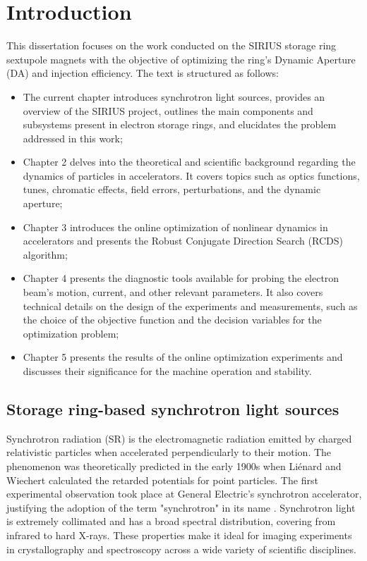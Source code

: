\chapter{Introduction}
This dissertation focuses on the work conducted on the SIRIUS storage ring sextupole magnets with the objective of optimizing the ring's Dynamic Aperture (DA) and injection efficiency. The text is structured as follows:
\begin{itemize}
    \item The current chapter introduces synchrotron light sources, provides an overview of the SIRIUS project, outlines the main components and subsystems present in electron storage rings, and elucidates the problem addressed in this work;
    \item Chapter 2 delves into the theoretical and scientific background regarding the dynamics of particles in accelerators. It covers topics such as optics functions, tunes, chromatic effects, field errors, perturbations, and the dynamic aperture;
    \item Chapter 3 introduces the online optimization of nonlinear dynamics in accelerators and presents the Robust Conjugate Direction Search (RCDS) algorithm;
    \item Chapter 4 presents the diagnostic tools available for probing the electron beam's motion, current, and other relevant parameters. It also covers technical details on the design of the experiments and measurements, such as the choice of the objective function and the decision variables for the optimization problem;
    \item Chapter 5 presents the results of the online optimization experiments and discusses their significance for the machine operation and stability. 
\end{itemize}

\section{Storage ring-based synchrotron light sources}
Synchrotron radiation (SR) is the electromagnetic radiation emitted by charged relativistic particles when accelerated perpendicularly to their motion. The phenomenon was theoretically predicted in the early 1900s when Liénard and Wiechert calculated the retarded potentials for point particles. The first experimental observation took place at General Electric's synchrotron accelerator, justifying the adoption of the term "synchrotron" in its name \cite{wiedemann_particle_2015}. Synchrotron light is extremely collimated and has a broad spectral distribution, covering from infrared to hard X-rays. These properties make it ideal for imaging experiments in crystallography and spectroscopy across a wide variety of scientific disciplines.

